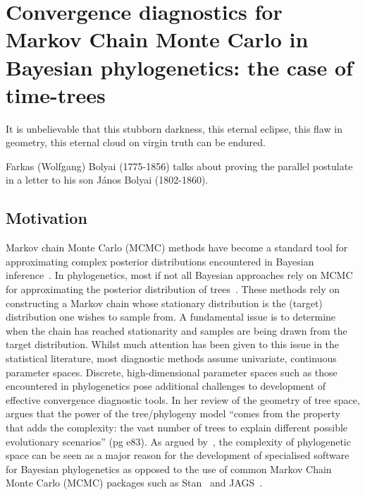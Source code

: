 \chapter{Convergence diagnostics for Markov Chain Monte Carlo in Bayesian phylogenetics: the case of time-trees}

\epigraph{It is unbelievable that this stubborn darkness, this eternal eclipse, this flaw in geometry, this eternal cloud on virgin truth can be endured.}{Farkas (Wolfgang) Bolyai (1775-1856) talks about proving the parallel postulate in a letter to his son J\'anos Bolyai (1802-1860).}


\section{Motivation}
\label{sec:intro}

Markov chain Monte Carlo (MCMC) methods have become a standard tool for approximating complex posterior distributions encountered in Bayesian inference~\citep{Robert2011}.
In phylogenetics, most if not all Bayesian approaches rely on MCMC for approximating the posterior distribution of trees~\citep{Li2000,Suchard2001,Huelsenbeck2001b}.
These methods rely on constructing a Markov chain whose stationary distribution is the (target) distribution one wishes to sample from.
A fundamental issue is to determine when the chain has reached stationarity and samples are being drawn from the target distribution.
Whilst much attention has been given to this issue in the statistical literature, most diagnostic methods assume univariate, continuous parameter spaces.
Discrete, high-dimensional parameter spaces such as those encountered in phylogenetics pose additional challenges to development of effective convergence diagnostic tools.
In her review of the geometry of tree space, \cite{StJohn2017} argues that the power of the tree/phylogeny model ``comes from the property that adds the complexity: the vast number of trees to explain different possible evolutionary scenarios'' (pg e83).
As argued by~\cite{Drummond2015}, the complexity of phylogenetic space can be seen as a major reason for the development of specialised software for Bayesian phylogenetics as opposed to the use of common Markov Chain Monte Carlo (MCMC) packages such as Stan~\citep{Carpenter2017} and JAGS~\citep{Plummer2003}. 

